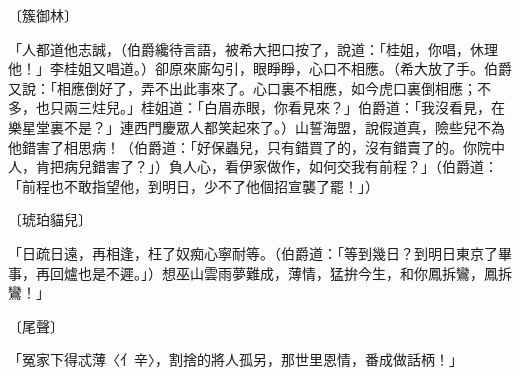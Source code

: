 〔簇御林〕

「人都道他志誠，（伯爵纔待言語，被希大把口按了，說道：「桂姐，你唱，休理他！」李桂姐又唱道。）卻原來廝勾引，眼睜睜，心口不相應。（希大放了手。伯爵又說：「相應倒好了，弄不出此事來了。心口裏不相應，如今虎口裏倒相應；不多，也只兩三炷兒。」桂姐道：「白眉赤眼，你看見來？」伯爵道：「我沒看見，在樂星堂裏不是？」連西門慶眾人都笑起來了。）山誓海盟，說假道真，險些兒不為他錯害了相思病！（伯爵道：「好保蟲兒，只有錯買了的，沒有錯賣了的。你院中人，肯把病兒錯害了？」）負人心，看伊家做作，如何交我有前程？」（伯爵道：「前程也不敢指望他，到明日，少不了他個招宣襲了罷！」）

〔琥珀貓兒〕

「日疏日遠，再相逢，枉了奴痴心寧耐等。（伯爵道：「等到幾日？到明日東京了畢事，再回爐也是不遲。」）想巫山雲雨夢難成，薄情，猛拚今生，和你鳳拆鸞，鳳拆鸞！」

〔尾聲〕

「冤家下得忒薄〈亻辛〉，割捨的將人孤另，那世里恩情，番成做話柄！」

